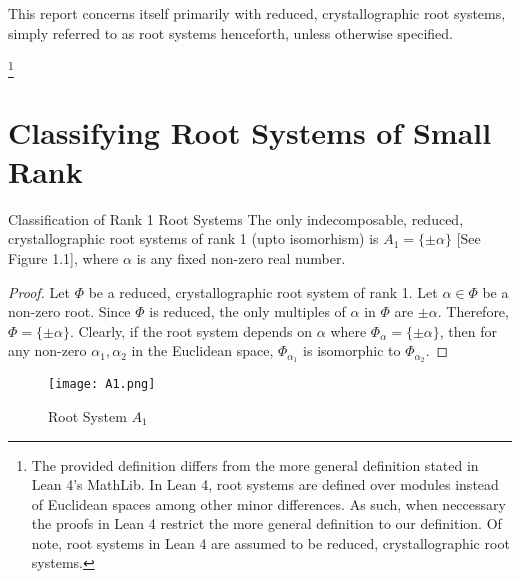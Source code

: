 This report concerns itself primarily with reduced, crystallographic root systems, simply referred to as root systems henceforth,
unless otherwise specified.

\footnote{
    The provided definition differs from the more general definition stated in Lean 4's MathLib.
    In Lean 4, root systems are defined over modules instead of Euclidean spaces among other minor differences.
    As such, when neccessary the proofs in Lean 4 restrict the more general definition to our definition.
    Of note, root systems in Lean 4 are assumed to be reduced, crystallographic root systems.} \newline

    \section{Classifying Root Systems of Small Rank}

\begin{namedtheorem}{Classification of Rank 1 Root Systems}
    The only indecomposable, reduced, crystallographic root systems of rank 1 (upto isomorhism) is $A_1 = \{ \pm \alpha \}$ [See Figure 1.1], where $\alpha$ is any fixed non-zero real number.
\end{namedtheorem}

\begin{proof}
    Let $\Phi$ be a reduced, crystallographic root system of rank 1.
    Let $\alpha \in \Phi$ be a non-zero root.
    Since $\Phi$ is reduced, the only multiples of $\alpha$ in $\Phi$ are $\pm \alpha$.
    Therefore, $\Phi = \{ \pm \alpha \}$.
    Clearly, if the root system depends on $\alpha$ where $\Phi_{\alpha} = \{ \pm \alpha \}$,
    then for any non-zero $\alpha_1, \alpha_2$ in the Euclidean space, $\Phi_{\alpha_1}$ is isomorphic
    to $\Phi_{\alpha_2}$.
\end{proof}

\begin{figure}[h]
    \centering
    \texttt{[image: A1.png]}
    \caption{Root System $A_1$}
\end{figure}

